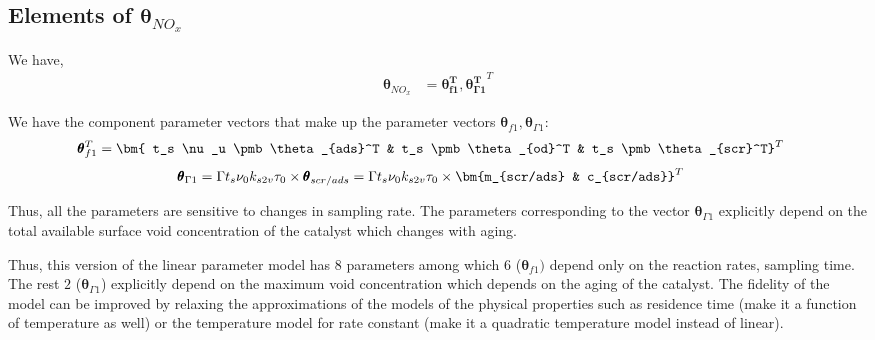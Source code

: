\subsection{Elements of $\pmb \theta_{NO_x}$}

We have,
\begin{align*}
        \pmb \theta_{NO_x} &= \bm{\pmb \theta_{f1}^T, \pmb \theta_{\Gamma 1}^T}^T
\end{align*}

We have the component parameter vectors that make up the parameter vectors $\pmb \theta_{f1}, \pmb \theta_{\Gamma 1}$:
\begin{align*}
        \pmb \theta_{f1}^T &= \bm{ t_s \nu_u \pmb \theta_{ads}^T &
                                t_s \pmb \theta_{od}^T        &
                                t_s \pmb \theta_{scr}^T} ^T
\end{align*}
\begin{align*}
        \pmb \theta_{\Gamma 1} &= \Gamma t_s \nu_0 k_{s2v} \tau_0 \times \pmb \theta_{scr/ads}
                                = \Gamma t_s \nu_0 k_{s2v} \tau_0 \times \bm{m_{scr/ads} & c_{scr/ads}}^T
\end{align*}


Thus, all the parameters are sensitive to changes in sampling rate. The parameters corresponding to the vector $\pmb \theta_{\Gamma 1}$ explicitly depend on the total available surface void concentration of the catalyst which changes with aging.

Thus, this version of the linear parameter model has 8 parameters among which $6$ ($\pmb \theta_{f1})$ depend only on the reaction rates, sampling time. The rest $2$ ($\pmb \theta_{\Gamma 1}$) explicitly depend on the maximum void concentration which depends on the aging of the catalyst. The fidelity of the model can be improved by relaxing the approximations of the models of the physical properties such as residence time (make it a function of temperature as well) or the temperature model for rate constant (make it a quadratic temperature model instead of linear).
